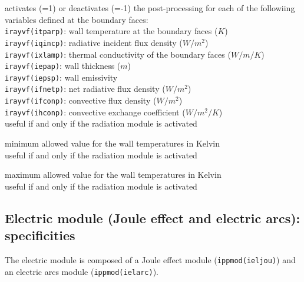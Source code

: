 {activates (=1) or deactivates (=-1) the post-processing for each of the
followiing variables defined at the boundary faces:\\
\hspace*{1.3cm} {\tt irayvf(itparp)}: wall temperature at the boundary
faces ($K$)\\
\hspace*{1.3cm} {\tt irayvf(iqincp)}: radiative incident flux density
($W/m^2$)\\
\hspace*{1.3cm} {\tt irayvf(ixlamp)}: thermal conductivity of the
boundary faces ($W/m/K$)\\
\hspace*{1.3cm} {\tt irayvf(iepap)}: wall thickness ($m$)\\
\hspace*{1.3cm} {\tt irayvf(iepsp)}: wall emissivity \\
\hspace*{1.3cm} {\tt irayvf(ifnetp)}: net radiative flux density ($W/m^2$)\\
\hspace*{1.3cm} {\tt irayvf(ifconp)}: convective flux density ($W/m^2$)\\
\hspace*{1.3cm} {\tt irayvf(ihconp)}: convective exchange coefficient
($W/m^2/K$)\\
useful if and only if the radiation module is activated}

{minimum allowed value for the wall temperatures in Kelvin\\
useful if and only if the radiation module is activated}

{maximum allowed value for the wall temperatures in Kelvin\\
useful if and only if the radiation module is activated}

\subsection{Electric module (Joule effect and electric arcs): specificities}

The electric module is composed of a Joule effect module
(\texttt{ippmod(ieljou)}) and an electric arcs module
(\texttt{ippmod(ielarc)}).

